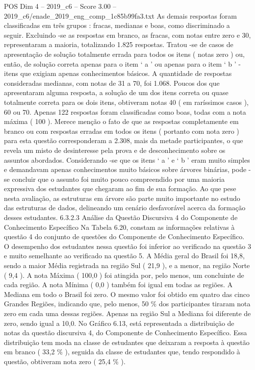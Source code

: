 \begin{textsample}{POS Dim 4 – 2019\_c6 – Score 3.00 – 2019\_c6/enade\_2019\_eng\_comp\_1c85b99fa3.txt}
As demais respostas foram classificadas em três grupos : fracas, medianas e boas, como discriminado a seguir.
Excluindo -se as respostas em branco, as fracas, com notas entre zero e 30, representaram a maioria, totalizando 1.825 respostas.
Tratou -se de casos de apresentação de solução totalmente errada para todos os itens ( notas zero ) ou, então, de solução correta apenas para o item ‘ a ’ ou apenas para o item ‘ b ’ - itens que exigiam apenas conhecimentos básicos.
A quantidade de respostas consideradas medianas, com notas de 31 a 70, foi 1.068.
Poucos dos que apresentaram alguma resposta, a solução de um dos itens correta ou quase totalmente correta para os dois itens, obtiveram notas 40 ( em raríssimos casos ), 60 ou 70.
Apenas 122 respostas foram classificadas como boas, todas com a nota máxima ( 100 ).
Merece menção o fato de que as respostas completamente em branco ou com respostas erradas em todos os itens ( portanto com nota zero ) para esta questão corresponderam a 2.308, mais da metade participantes, o que revela um misto de desinteresse pela prova e de desconhecimento sobre os assuntos abordados.
Considerando -se que os itens ‘ a ’ e ‘ b ’ eram muito simples e demandavam apenas conhecimentos muito básicos sobre árvores binárias, pode -se concluir que o assunto foi muito pouco compreendido por uma maioria expressiva dos estudantes que chegaram ao fim de sua formação.
Ao que pese nesta avaliação, as estruturas em árvore são parte muito importante no estudo das estruturas de dados, delineando um cenário desfavorável acerca da formação desses estudantes. 6.3.2.3 Análise da Questão Discursiva 4 do Componente de Conhecimento Específico Na Tabela 6.20, constam as informações relativas à questão 4 do conjunto de questões do Componente de Conhecimento Específico.
O desempenho dos estudantes nessa questão foi inferior ao verificado na questão 3 e muito semelhante ao verificado na questão 5.
A Média geral do Brasil foi 18,8, sendo a maior Média registrada na região Sul ( 21,9 ), e a menor, na região Norte ( 9,4 ).
A nota Máxima ( 100,0 ) foi atingida por, pelo menos, um concluinte de cada região.
A nota Mínima ( 0,0 ) também foi igual em todas as regiões.
A Mediana em todo o Brasil foi zero.
O mesmo valor foi obtido em quatro das cinco Grandes Regiões, indicando que, pelo menos, 50 \% dos participantes tiraram nota zero em cada uma dessas regiões.
Apenas na região Sul a Mediana foi diferente de zero, sendo igual a 10,0.
No Gráfico 6.13, está representada a distribuição de notas da questão discursiva 4, do Componente de Conhecimento Específico.
Essa distribuição tem moda na classe de estudantes que deixaram a resposta à questão em branco ( 33,2 \% ), seguida da classe de estudantes que, tendo respondido à questão, obtiveram nota zero ( 25,4 \% ).

\end{textsample}
